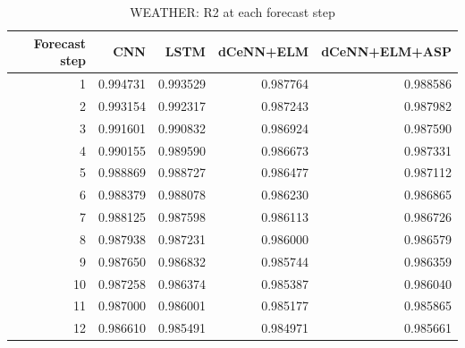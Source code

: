 \begin{table}
\caption{WEATHER: R2 at each forecast step}
\begin{tabular}{rrrrr}
\toprule
Forecast step & CNN & LSTM & dCeNN+ELM & dCeNN+ELM+ASP \\
\midrule
1 & 0.994731 & 0.993529 & 0.987764 & 0.988586 \\
2 & 0.993154 & 0.992317 & 0.987243 & 0.987982 \\
3 & 0.991601 & 0.990832 & 0.986924 & 0.987590 \\
4 & 0.990155 & 0.989590 & 0.986673 & 0.987331 \\
5 & 0.988869 & 0.988727 & 0.986477 & 0.987112 \\
6 & 0.988379 & 0.988078 & 0.986230 & 0.986865 \\
7 & 0.988125 & 0.987598 & 0.986113 & 0.986726 \\
8 & 0.987938 & 0.987231 & 0.986000 & 0.986579 \\
9 & 0.987650 & 0.986832 & 0.985744 & 0.986359 \\
10 & 0.987258 & 0.986374 & 0.985387 & 0.986040 \\
11 & 0.987000 & 0.986001 & 0.985177 & 0.985865 \\
12 & 0.986610 & 0.985491 & 0.984971 & 0.985661 \\
\bottomrule
\end{tabular}
\end{table}
